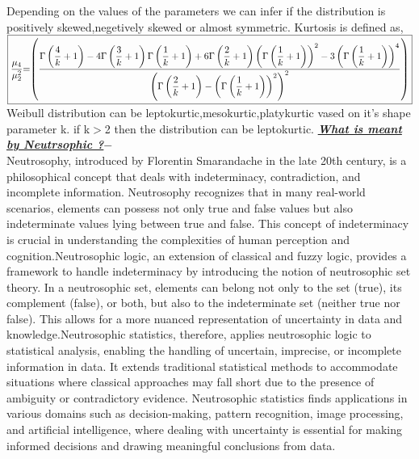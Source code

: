 \documentclass[12pt,a4paper,oneside]{article}
\begin{document}
\newline\newline
Depending on the values of the parameters we can infer if the distribution is positively skewed,negetively skewed or almost symmetric.
Kurtosis is defined as,\\
\newline\newline $\boxed{\dfrac{\mu_{4}}{\mu_{2}^{2}}$=$\left(\dfrac{\Gamma\left(\dfrac{4}{k}+1\right)-4\Gamma\left(\dfrac{3}{k}+1\right)\Gamma\left(\dfrac{1}{k}+1\right)+6\Gamma\left(\dfrac{2}{k}+1\right)\left(\Gamma\left(\dfrac{1}{k}+1\right)\right)^{2}-3\left(\Gamma\left(\dfrac{1}{k}+1\right)\right)^{4}}{\left(\Gamma\left(\dfrac{2}{k}+1\right)-\left(\Gamma\left(\dfrac{1}{k}+1\right)\right)^{2}\right)^{2}}\right)}$\\
\newline\newline Weibull distribution can be leptokurtic,mesokurtic,platykurtic vased on it's shape parameter k. if k$>$2  then the distribution can be leptokurtic.
\newpage
\textrm{\textit{\textbf{\underline{What is meant by Neutrsophic ?$-$}}}}\\
Neutrosophy, introduced by Florentin Smarandache in the late 20th century, is a philosophical concept that deals with indeterminacy, contradiction, and incomplete information. Neutrosophy recognizes that in many real-world scenarios, elements can possess not only true and false values but also indeterminate values lying between true and false. This concept of indeterminacy is crucial in understanding the complexities of human perception and cognition.Neutrosophic logic, an extension of classical and fuzzy logic, provides a framework to handle indeterminacy by introducing the notion of neutrosophic set theory. In a neutrosophic set, elements can belong not only to the set (true), its complement (false), or both, but also to the indeterminate set (neither true nor false). This allows for a more nuanced representation of uncertainty in data and knowledge.Neutrosophic statistics, therefore, applies neutrosophic logic to statistical analysis, enabling the handling of uncertain, imprecise, or incomplete information in data. It extends traditional statistical methods to accommodate situations where classical approaches may fall short due to the presence of ambiguity or contradictory evidence. Neutrosophic statistics finds applications in various domains such as decision-making, pattern recognition, image processing, and artificial intelligence, where dealing with uncertainty is essential for making informed decisions and drawing meaningful conclusions from data.\newline\newline
\end{document}
